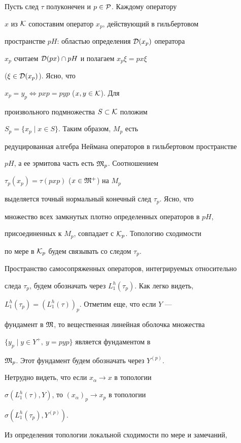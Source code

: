 Пусть след $\tau $ полуконечен и $p \in {\cal P}$. Каждому оператору 


$x$ из ${\cal K}$ сопоставим оператор $x_p$, действующий в гильбертовом 


пространстве $pH$: областью определения ${\cal D} (x_p)$ оператора 


$x_p$ считаем ${\cal D} (px) \cap pH$ и полагаем $x_p \xi=px \xi$ 


($\xi \in {\cal D} (x_p)$). Ясно, что


$x_p=y_p \Leftrightarrow pxp=pyp$ ($x,y \in {\cal K}$). Для 


произвольного подмножества $S \subset {\cal K}$ положим 


$S_p=\{x_p \mid x \in S\}$. Таким образом, $M_p$ есть 


редуцированная алгебра Неймана операторов в гильбертовом пространстве 


$pH$, а ее эрмитова часть есть $\frak M_p$. Соотношением 


$\tau_p (x_p)=\tau (pxp)$ ($x \in \frak M^+$) на $M_p$ 


выделяется точный нормальный конечный след $\tau_p$. Ясно, что 


множество всех замкнутых плотно определенных операторов в $pH$, 


присоединенных к $M_p$, совпадает с ${\cal K}_p$. Топологию сходимости 


по мере в ${\cal K}_p$ будем связывать со следом $\tau_p$. 


Пространство самосопряженных операторов, интегрируемых относительно 


следа $\tau_p$, будем обозначать через $L_1^h (\tau_p)$. Как легко видеть, 


$L_1^h (\tau_p)=(L_1^h (\tau))_p$. Отметим еще, что если $Y$ --- 


фундамент в $\frak M$, то вещественная линейная оболочка множества 


$\{y_p \mid y \in Y^+, \ y=pyp\}$ является фундаментом в 


${\frak M}_p$. Этот фундамент будем обозначать через $Y^{(p)}$. 


Нетрудно видеть, что если $x_{\alpha} \to x$ в топологии 


$\sigma (L_1^h (\tau), Y)$, то $(x_{\alpha})_p \to x_p$ в топологии 


$\sigma (L_1^h (\tau_p), Y^{(p)})$. 





Из определения топологии локальной сходимости по мере и замечаний, 


